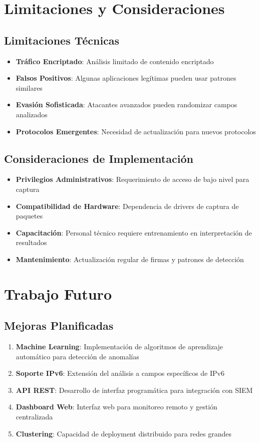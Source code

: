 \documentclass[12pt,a4paper]{article}
\begin{document}
\section{Limitaciones y Consideraciones}

\subsection{Limitaciones Técnicas}

\begin{itemize}
    \item \textbf{Tráfico Encriptado}: Análisis limitado de contenido encriptado
    \item \textbf{Falsos Positivos}: Algunas aplicaciones legítimas pueden usar patrones similares
    \item \textbf{Evasión Sofisticada}: Atacantes avanzados pueden randomizar campos analizados
    \item \textbf{Protocolos Emergentes}: Necesidad de actualización para nuevos protocolos
\end{itemize}

\subsection{Consideraciones de Implementación}

\begin{itemize}
    \item \textbf{Privilegios Administrativos}: Requerimiento de acceso de bajo nivel para captura
    \item \textbf{Compatibilidad de Hardware}: Dependencia de drivers de captura de paquetes
    \item \textbf{Capacitación}: Personal técnico requiere entrenamiento en interpretación de resultados
    \item \textbf{Mantenimiento}: Actualización regular de firmas y patrones de detección
\end{itemize}

\section{Trabajo Futuro}

\subsection{Mejoras Planificadas}

\begin{enumerate}
    \item \textbf{Machine Learning}: Implementación de algoritmos de aprendizaje automático para detección de anomalías
    \item \textbf{Soporte IPv6}: Extensión del análisis a campos específicos de IPv6
    \item \textbf{API REST}: Desarrollo de interfaz programática para integración con SIEM
    \item \textbf{Dashboard Web}: Interfaz web para monitoreo remoto y gestión centralizada
    \item \textbf{Clustering}: Capacidad de deployment distribuido para redes grandes
\end{enumerate}
\end{document}
